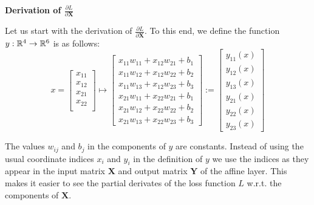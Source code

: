 \documentclass{article}
\begin{document}
\vspace{0.3cm}
\noindent \large \textbf{Derivation of \(\frac{\partial L}{\partial \mathbf{X}}\)}
\vspace{0.3cm}
\normalsize

Let us start with the derivation of $\frac{\partial L}{\partial \mathbf{X}}$. To this end, 
we define the function \(y: \mathbb{R}^{4} \rightarrow \mathbb{R}^{6}\) is as follows:
\[
    x = \begin{bmatrix}
        x_{11} \\
        x_{12} \\
        x_{21} \\
        x_{22} \\
    \end{bmatrix} \mapsto \begin{bmatrix}
        x_{11}w_{11} + x_{12}w_{21} + b_{1} \\
        x_{11}w_{12} + x_{12}w_{22} + b_{2} \\
        x_{11}w_{13} + x_{12}w_{23} + b_{3} \\
        x_{21}w_{11} + x_{22}w_{21} + b_{1} \\
        x_{21}w_{12} + x_{22}w_{22} + b_{2} \\
        x_{21}w_{13} + x_{22}w_{23} + b_{3}
    \end{bmatrix} := \begin{bmatrix}
        y_{11}(x) \\
        y_{12}(x) \\
        y_{13}(x) \\
        y_{21}(x) \\
        y_{22}(x) \\
        y_{23}(x)
    \end{bmatrix}
\]

\vspace{0.15cm}
\noindent 
The values \(w_{ij}\) and \(b_{j}\) in the components of $y$ are constants. Instead of using the 
usual coordinate indices \(x_{i}\) and \(y_{i}\) in the definition of \(y\) we use the indices 
as they appear in the input matrix \(\mathbf{X}\) and output matrix \(\mathbf{Y}\) of the affine 
layer. This makes it easier to see the partial derivates of the loss function \(L\) w.r.t. the 
components of \(\mathbf{X}\). 
\end{document}
